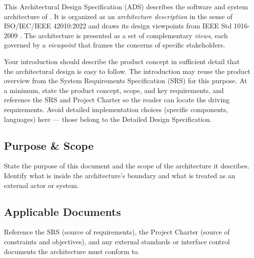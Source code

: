 This Architectural Design Specification (ADS) describes the software and system architecture of \productname. It is organized as an \textit{architecture description} in the sense of ISO/IEC/IEEE 42010:2022 \cite{ISO42010} and draws its design viewpoints from IEEE Std 1016-2009 \cite{IEEE1016}. The architecture is presented as a set of complementary \textit{views}, each governed by a \textit{viewpoint} that frames the concerns of specific stakeholders.

Your introduction should describe the product concept in sufficient detail that the architectural design is easy to follow. The introduction may reuse the product overview from the System Requirements Specification (SRS) for this purpose. At a minimum, state the product concept, scope, and key requirements, and reference the SRS and Project Charter so the reader can locate the driving requirements. Avoid detailed implementation choices (specific components, languages) here --- those belong to the Detailed Design Specification.

\subsection{Purpose \& Scope}
State the purpose of this document and the scope of the architecture it describes. Identify what is inside the architecture's boundary and what is treated as an external actor or system.

\subsection{Applicable Documents}
Reference the SRS (source of requirements), the Project Charter (source of constraints and objectives), and any external standards or interface control documents the architecture must conform to.
